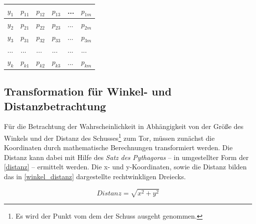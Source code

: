 \tablelasttail{}
\begin{center}%
\begin{supertabular}{ | P{3.2cm} | P{1.5cm} | P{1.5cm} | P{1.5cm} | P{1.5cm} |  P{1.5cm} |}
\textsf{$y_1$}	&   $p_{11}$	& 	$p_{12}$  &  $p_{13}$  &  ... &  $p_{1m}$\\
\hline
\textsf{$y_2$}	&   $p_{21}$	& 	$p_{22}$  &  $p_{23}$  &  ... &  $p_{2m}$\\
\hline
\textsf{$y_3$}	&   $p_{31}$	& 	$p_{32}$  &  $p_{33}$  &  ... &  $p_{3m}$\\
\hline
\textsf{...}	&   ...	        & 	...       &  ...        &  ... & ...\\
\hline
\textsf{$y_k$}	&   $p_{k1}$	& 	$p_{k2}$  &  $p_{k3}$  &  ... &  $p_{km	}$\\
\hline
\end{supertabular}
\end{center}




\subsection{Transformation für Winkel- und Distanzbetrachtung}
\label{wdt}
Für die Betrachtung der Wahrscheinlichkeit in Abhängigkeit von der Größe des Winkels und der Distanz des Schusses\footnote{Es wird der Punkt vom dem der Schuss ausgeht genommen.} zum Tor, müssen zunächst die Koordinaten durch mathematische Berechnungen transformiert werden. Die Distanz kann dabei mit Hilfe des \textit{Satz des Pythagoras} -- in umgestellter Form der \vref{distanz} -- ermittelt werden. Die x- und y-Koordinaten, sowie die Distanz bilden das in \vref{winkel_distanz} dargestellte rechtwinkligen Dreiecks. 

\begin{equation}
\label{distanz}
Distanz= \sqrt{x^2 + y^2}
\end{equation}

